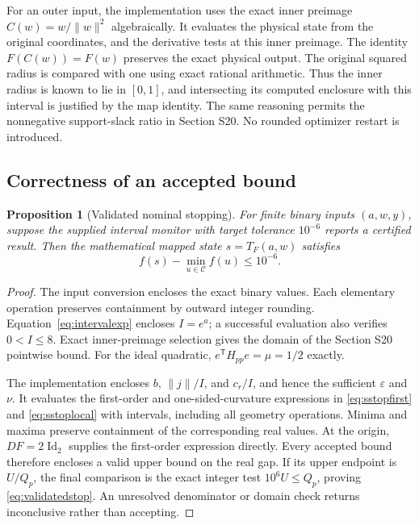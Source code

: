 \documentclass[10pt,a4paper]{article}
\newtheorem{proposition}[theorem]{Proposition}
\begin{document}
For an outer input, the implementation uses the exact inner preimage $C(w)=w/\|w\|^2$ algebraically. It evaluates the physical state from the original coordinates, and the derivative tests at this inner preimage. The identity $F(C(w))=F(w)$ preserves the exact physical output. The original squared radius is compared with one using exact rational arithmetic. Thus the inner radius is known to lie in $[0,1]$, and intersecting its computed enclosure with this interval is justified by the map identity. The same reasoning permits the nonnegative support-slack ratio in Section S20. No rounded optimizer restart is introduced.

\subsection{Correctness of an accepted bound}
\begin{proposition}[Validated nominal stopping]
\label{prop:validatedstop}
For finite binary inputs $(a,w,y)$, suppose the supplied interval monitor with target tolerance $10^{-6}$ reports a certified result. Then the mathematical mapped state $s=T_F(a,w)$ satisfies
\begin{equation}
 f(s)-\min_{u\in\mathcal C}f(u)\le10^{-6}.
 \label{eq:validatedstop}
\end{equation}
\end{proposition}
\begin{proof}
The input conversion encloses the exact binary values. Each elementary operation preserves containment by outward integer rounding. Equation~\eqref{eq:intervalexp} encloses $I=e^a$; a successful evaluation also verifies $0<I\le8$. Exact inner-preimage selection gives the domain of the Section S20 pointwise bound. For the ideal quadratic, $e^{\mathsf T}H_{pp}e=\mu=1/2$ exactly.

The implementation encloses $b$, $\|j\|/I$, and $c_r/I$, and hence the sufficient $\varepsilon$ and $\nu$. It evaluates the first-order and one-sided-curvature expressions in \eqref{eq:sstopfirst} and \eqref{eq:sstoplocal} with intervals, including all geometry operations. Minima and maxima preserve containment of the corresponding real values. At the origin, $DF=2\operatorname{Id}_2$ supplies the first-order expression directly. Every accepted bound therefore encloses a valid upper bound on the real gap. If its upper endpoint is $U/Q_p$, the final comparison is the exact integer test $10^6U\le Q_p$, proving \eqref{eq:validatedstop}. An unresolved denominator or domain check returns inconclusive rather than accepting.
\end{proof}
\end{document}
